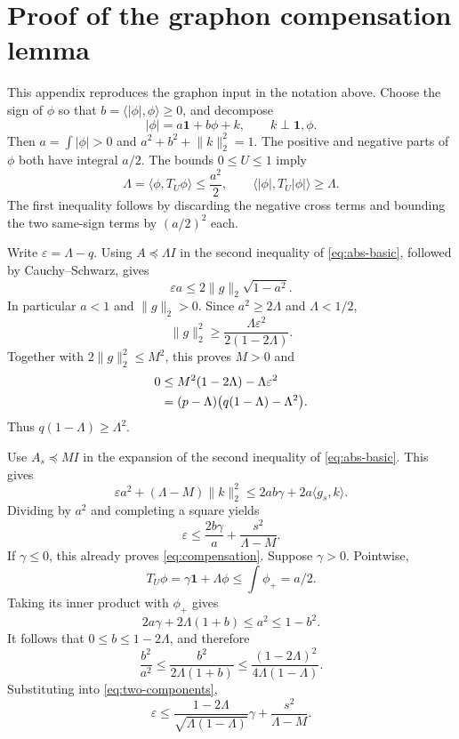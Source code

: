 \documentclass[11pt]{article}
\theoremstyle{remark}
\newcommand{\one}{\mathbf 1}
\newcommand{\ip}[2]{\langle #1,#2\rangle}
\newcommand{\norm}[1]{\lVert #1\rVert_2}
\begin{document}
\appendix
\section{Proof of the graphon compensation lemma}\label{app:compensation}

This appendix reproduces the graphon input \cite[Lemma 5]{companion} in the notation above. Choose the sign of $\phi$ so that $b=\ip{|\phi|}\phi\ge0$, and decompose
\[
 |\phi|=a\one+b\phi+k,\qquad k\perp\one,\phi.
\]
Then $a=\int|\phi|>0$ and $a^2+b^2+\norm k^2=1$. The positive and negative parts of $\phi$ both have integral $a/2$. The bounds $0\le U\le1$ imply
\begin{equation}\label{eq:abs-basic}
 \Lambda=\ip\phi{T_U\phi}\le\frac{a^2}{2},
 \qquad
 \ip{|\phi|}{T_U|\phi|}\ge\Lambda.
\end{equation}
The first inequality follows by discarding the negative cross terms and bounding the two same-sign terms by $(a/2)^2$ each.

Write $\varepsilon=\Lambda-q$. Using $A\preceq\Lambda I$ in the second inequality of \eqref{eq:abs-basic}, followed by Cauchy--Schwarz, gives
\[
 \varepsilon a\le2\norm g\sqrt{1-a^2}.
\]
In particular $a<1$ and $\norm g>0$. Since $a^2\ge2\Lambda$ and $\Lambda<1/2$,
\[
 \norm g^2\ge\frac{\Lambda\varepsilon^2}{2(1-2\Lambda)}.
\]
Together with $2\norm g^2\le M^2$, this proves $M>0$ and
\begin{align}\label{eq:feasible}
 0&\le M^2(1-2\Lambda)-\Lambda\varepsilon^2\notag\\
  &=(p-\Lambda)\bigl(q(1-\Lambda)-\Lambda^2\bigr).
\end{align}
Thus $q(1-\Lambda)\ge\Lambda^2$.

Use $A_s\preceq MI$ in the expansion of the second inequality of \eqref{eq:abs-basic}. This gives
\[
 \varepsilon a^2+(\Lambda-M)\norm k^2
 \le2ab\gamma+2a\ip{g_s}k.
\]
Dividing by $a^2$ and completing a square yields
\begin{equation}\label{eq:two-components}
 \varepsilon\le\frac{2b\gamma}{a}+\frac{s^2}{\Lambda-M}.
\end{equation}
If $\gamma\le0$, this already proves \eqref{eq:compensation}. Suppose $\gamma>0$. Pointwise,
\[
 T_U\phi=\gamma\one+\Lambda\phi\le\int\phi_+=a/2.
\]
Taking its inner product with $\phi_+$ gives
\[
 2a\gamma+2\Lambda(1+b)\le a^2\le1-b^2.
\]
It follows that $0\le b\le1-2\Lambda$, and therefore
\[
 \frac{b^2}{a^2}
 \le\frac{b^2}{2\Lambda(1+b)}
 \le\frac{(1-2\Lambda)^2}{4\Lambda(1-\Lambda)}.
\]
Substituting into \eqref{eq:two-components},
\[
 \varepsilon\le
 \frac{1-2\Lambda}{\sqrt{\Lambda(1-\Lambda)}}\gamma
 +\frac{s^2}{\Lambda-M}.
\]
\end{document}
